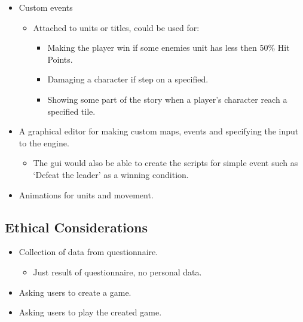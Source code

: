 \begin{itemize}
	\item Custom events
	\begin{itemize}
		\item Attached to units or titles, could be used for:
		\begin{itemize}
			\item Making the player win if some enemies unit has less then 50\% Hit Points.
			
			\item Damaging a character if step on a specified.
			
			\item Showing some part of the story when a player's character reach a specified tile.
		\end{itemize}
	\end{itemize}
	
	\item A graphical editor for making custom maps, events and specifying the input to the engine.
	\begin{itemize}
		\item The gui would also be able to create the scripts for simple event such as `Defeat the leader' as a winning condition.
	\end{itemize}
	\item Animations for units and movement.
\end{itemize}

\subsection{Ethical Considerations} 
\label{ethicalconsiderations}
\begin{itemize}
	
	\item Collection of data from questionnaire.
	\begin{itemize}
		\item Just result of questionnaire, no personal data.
	\end{itemize}
	
	\item Asking users to create a game.
	
	\item Asking users to play the created game.
\end{itemize}

